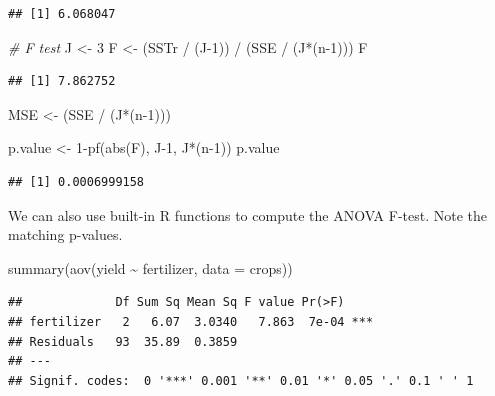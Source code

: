 \documentclass[
]{book}
\newenvironment{Shaded}{\begin{snugshade}}{\end{snugshade}}
\newcommand{\AttributeTok}[1]{\textcolor[rgb]{0.77,0.63,0.00}{#1}}
\newcommand{\CommentTok}[1]{\textcolor[rgb]{0.56,0.35,0.01}{\textit{#1}}}
\newcommand{\DecValTok}[1]{\textcolor[rgb]{0.00,0.00,0.81}{#1}}
\newcommand{\FunctionTok}[1]{\textcolor[rgb]{0.00,0.00,0.00}{#1}}
\newcommand{\NormalTok}[1]{#1}
\newcommand{\OtherTok}[1]{\textcolor[rgb]{0.56,0.35,0.01}{#1}}
\newcommand{\SpecialCharTok}[1]{\textcolor[rgb]{0.00,0.00,0.00}{#1}}
\begin{document}
\begin{verbatim}
## [1] 6.068047
\end{verbatim}

\begin{Shaded}
\begin{Highlighting}[]
\CommentTok{\# F test}
\NormalTok{J }\OtherTok{\textless{}{-}} \DecValTok{3}
\NormalTok{F }\OtherTok{\textless{}{-}}\NormalTok{ (SSTr }\SpecialCharTok{/}\NormalTok{ (J}\DecValTok{{-}1}\NormalTok{)) }\SpecialCharTok{/}\NormalTok{ (SSE }\SpecialCharTok{/}\NormalTok{ (J}\SpecialCharTok{*}\NormalTok{(n}\DecValTok{{-}1}\NormalTok{)))}
\NormalTok{F}
\end{Highlighting}
\end{Shaded}

\begin{verbatim}
## [1] 7.862752
\end{verbatim}

\begin{Shaded}
\begin{Highlighting}[]
\NormalTok{MSE }\OtherTok{\textless{}{-}}\NormalTok{ (SSE }\SpecialCharTok{/}\NormalTok{ (J}\SpecialCharTok{*}\NormalTok{(n}\DecValTok{{-}1}\NormalTok{)))}

\NormalTok{p.value }\OtherTok{\textless{}{-}} \DecValTok{1}\SpecialCharTok{{-}}\FunctionTok{pf}\NormalTok{(}\FunctionTok{abs}\NormalTok{(F), J}\DecValTok{{-}1}\NormalTok{, J}\SpecialCharTok{*}\NormalTok{(n}\DecValTok{{-}1}\NormalTok{))}
\NormalTok{p.value}
\end{Highlighting}
\end{Shaded}

\begin{verbatim}
## [1] 0.0006999158
\end{verbatim}

We can also use built-in R functions to compute the ANOVA F-test. Note the matching p-values.

\begin{Shaded}
\begin{Highlighting}[]
\FunctionTok{summary}\NormalTok{(}\FunctionTok{aov}\NormalTok{(yield }\SpecialCharTok{\textasciitilde{}}\NormalTok{ fertilizer, }\AttributeTok{data =}\NormalTok{ crops))}
\end{Highlighting}
\end{Shaded}

\begin{verbatim}
##             Df Sum Sq Mean Sq F value Pr(>F)    
## fertilizer   2   6.07  3.0340   7.863  7e-04 ***
## Residuals   93  35.89  0.3859                   
## ---
## Signif. codes:  0 '***' 0.001 '**' 0.01 '*' 0.05 '.' 0.1 ' ' 1
\end{verbatim}
\end{document}
